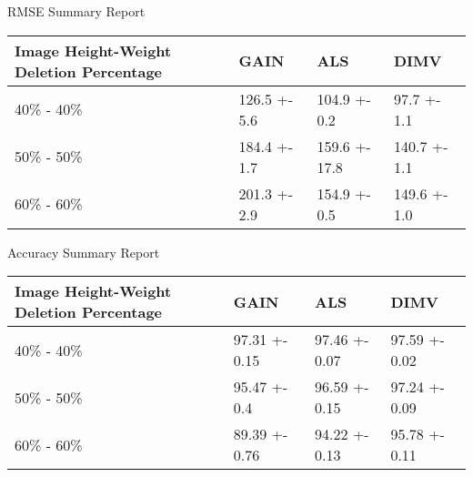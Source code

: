 

 RMSE Summary Report 
 \begin{tabular}{llll}
\toprule
Image Height-Weight Deletion Percentage &         GAIN &           ALS &         DIMV \\
\midrule
                              40\% - 40\% & 126.5 +- 5.6 &  104.9 +- 0.2 &  97.7 +- 1.1 \\
                              50\% - 50\% & 184.4 +- 1.7 & 159.6 +- 17.8 & 140.7 +- 1.1 \\
                              60\% - 60\% & 201.3 +- 2.9 &  154.9 +- 0.5 & 149.6 +- 1.0 \\
\bottomrule
\end{tabular}


 Accuracy Summary Report 
 \begin{tabular}{llll}
\toprule
Image Height-Weight Deletion Percentage &          GAIN &           ALS &          DIMV \\
\midrule
                              40\% - 40\% & 97.31 +- 0.15 & 97.46 +- 0.07 & 97.59 +- 0.02 \\
                              50\% - 50\% &  95.47 +- 0.4 & 96.59 +- 0.15 & 97.24 +- 0.09 \\
                              60\% - 60\% & 89.39 +- 0.76 & 94.22 +- 0.13 & 95.78 +- 0.11 \\
\bottomrule
\end{tabular}


